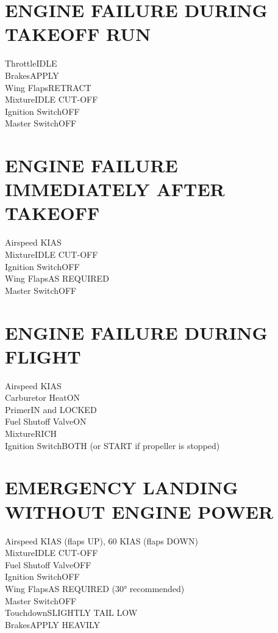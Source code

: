 \documentclass{article}
\begin{document}
\color{Black}
\begin{multicols*}{2}
\section*{ENGINE FAILURE DURING TAKEOFF RUN}
Throttle\dotfill IDLE\\
Brakes\dotfill APPLY\\
Wing Flaps\dotfill RETRACT\\
Mixture\dotfill IDLE CUT-OFF\\
Ignition Switch\dotfill OFF\\
Master Switch\dotfill OFF
\section*{ENGINE FAILURE IMMEDIATELY AFTER TAKEOFF}
Airspeed KIAS\\
Mixture\dotfill IDLE CUT-OFF\\
Ignition Switch\dotfill OFF\\
Wing Flaps\dotfill AS REQUIRED\\
Master Switch\dotfill OFF
\section*{ENGINE FAILURE DURING FLIGHT}
Airspeed KIAS\\
Carburetor Heat\dotfill ON\\
Primer\dotfill IN and LOCKED\\
Fuel Shutoff Valve\dotfill ON\\
Mixture\dotfill RICH\\
Ignition Switch\dotfill BOTH (or START if propeller is stopped)\\
\section*{EMERGENCY LANDING WITHOUT ENGINE POWER}
Airspeed KIAS (flaps UP), 60 KIAS (flaps DOWN)\\
Mixture\dotfill IDLE CUT-OFF\\
Fuel Shutoff Valve\dotfill OFF\\
Ignition Switch\dotfill OFF\\
Wing Flaps\dotfill AS REQUIRED (30° recommended)\\
Master Switch\dotfill OFF\\
Touchdown\dotfill SLIGHTLY TAIL LOW\\
Brakes\dotfill APPLY HEAVILY

\end{multicols*}
\end{document}
